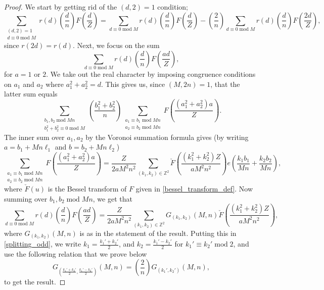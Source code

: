 \documentclass[12pt]{amsart}
\def\Z{\mathbb{Z}}
\def\Z{\mathbb Z}
\def\Z{\mathbb Z}
\def\mod{\operatorname{mod}}
\begin{document}
\begin{proof}
    We start by getting rid of the $(d,2)=1$ condition;
    \begin{equation}\label{splitting_odd}
    \sum_{\substack{(d,2)=1 \\ d\equiv 0 \mod M}} r(d) \left( \frac{d}{n} \right) F\left( \frac{d}{Z} \right) = \sum_{ d\equiv 0 \mod M} r(d) \left( \frac{d}{n} \right) F\left( \frac{d}{Z} \right) - \left( \frac{2}{n} \right) \sum_{d\equiv 0 \mod M} r(d) \left( \frac{d}{n} \right) F\left( \frac{2d}{Z} \right),
    \end{equation}
    since $r(2d)=r(d)$. Next, we focus on the sum
    $$ \sum_{d\equiv 0 \mod M} r(d) \left( \frac{d}{n} \right) F\left( \frac{ad}{Z} \right) ,$$
    for $a=1$ or $2$. We take out the real character by imposing congruence conditions on  $a_1$ and $a_2$ where $a_1^2+a_2^2=d$. This gives us, since $(M,2n)=1$, that the latter sum equals
    $$ \sum_{\substack{b_1,b_2 \mod Mn \\ b_1^2+b_2^2\equiv 0\mod M}} \left( \frac{b_1^2+b_2^2}{n}\right) \sum_{\substack{a_1\equiv b_1 \mod Mn \\ a_2\equiv b_2 \mod Mn}} F\left(\frac{(a_1^2+a_2^2) a}{Z} \right). $$
    The inner sum over $a_1,a_2$ by the Voronoi summation formula gives (by writing $a=b_1 + Mn \ell_1$ and $b=b_2 + Mn \ell_2$)
    $$ \sum_{\substack{a_1\equiv b_1 \mod Mn \\ a_2\equiv b_2 \mod Mn}} F\left(\frac{(a_1^2+a_2^2) a}{Z} \right) = \frac{Z}{2aM^2n^2} \sum_{(k_1,k_2)\in \Z^2} \check{F}\left(  \frac{(k_1^2+k_2^2)Z}{a M^2n^2}\right) e\left( \frac{k_1b_1}{Mn} + \frac{k_2 b_2}{Mn} \right) ,$$
    where
    $ \check{F}(u)$ is the Bessel transform of $F$ given in \eqref{bessel_transform_def}. 
    Now summing over $b_1,b_2 \mod Mn$, we get that
    $$ \sum_{d\equiv 0 \mod M} r(d) \left( \frac{d}{n} \right) F\left( \frac{ad}{Z} \right)  = \frac{Z}{2aM^2n^2} \sum_{(k_1,k_2)\in \Z^2} G_{(k_1,k_2)}(M,n) \check{F}\left(  \frac{(k_1^2+k_2^2)Z}{a M^2n^2}\right),  $$
    where $G_{(k_1,k_2)}(M,n)$ is as in the statement of the result. Putting this in \eqref{splitting_odd}, we write $k_1=\frac{k_1'+k_2'}{2}$, and $k_2=\frac{k_1'-k_2'}{2}$ for $k_1'\equiv k_2'\mod 2$, and use the following relation that we prove below $$G_{\left(\frac{k_1'+k_2'}{2},\frac{k_1'-k_2'}{2}\right)}(M, n) = \left(\frac{2}{n}\right) G_{(k_1',k_2')}(M, n),$$ to get the result.


\end{proof}
\end{document}
